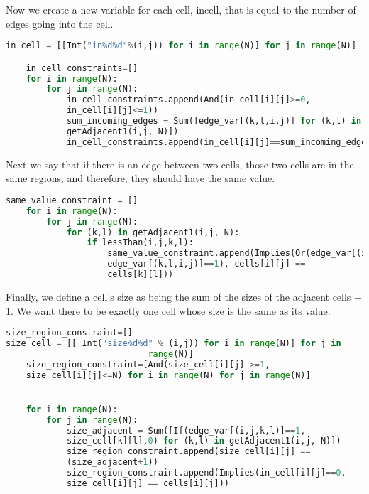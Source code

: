 Now we create a new variable for each cell, incell, that is equal to
the number of edges going into the cell.

\singlespace
\begin{lstlisting}[language=python]
in_cell = [[Int("in%d%d"%(i,j)) for i in range(N)] for j in range(N)]

    in_cell_constraints=[]
    for i in range(N):
        for j in range(N):
            in_cell_constraints.append(And(in_cell[i][j]>=0,
            in_cell[i][j]<=1))
            sum_incoming_edges = Sum([edge_var[(k,l,i,j)] for (k,l) in
            getAdjacent1(i,j, N)])
            in_cell_constraints.append(in_cell[i][j]==sum_incoming_edges)
\end{lstlisting}
\doublespace

Next we say that if there is an edge between two cells, those two
cells are in the same regions, and therefore, they should have the
same value.

\singlespace
\begin{lstlisting}[language=python]
  same_value_constraint = []
    for i in range(N):
        for j in range(N):
            for (k,l) in getAdjacent1(i,j, N):
                if lessThan(i,j,k,l):
                    same_value_constraint.append(Implies(Or(edge_var[(i,j,k,l)]==1,
                    edge_var[(k,l,i,j)]==1), cells[i][j] ==
                    cells[k][l]))

\end{lstlisting}
\doublespace

Finally, we define a cell’s size as being the sum of the sizes of the
adjacent cells + 1. We want there to be exactly one cell whose size is
the same as its value.

\singlespace
\begin{lstlisting}[language=python]
size_region_constraint=[]
size_cell = [[ Int("size%d%d" % (i,j)) for i in range(N)] for j in
                            range(N)]
    size_region_constraint=[And(size_cell[i][j] >=1,
    size_cell[i][j]<=N) for i in range(N) for j in range(N)]


    for i in range(N):
        for j in range(N):
            size_adjacent = Sum([If(edge_var[(i,j,k,l)]==1,
            size_cell[k][l],0) for (k,l) in getAdjacent1(i,j, N)])
            size_region_constraint.append(size_cell[i][j] ==
            (size_adjacent+1))
            size_region_constraint.append(Implies(in_cell[i][j]==0,
            size_cell[i][j] == cells[i][j]))
\end{lstlisting}
\doublespace

